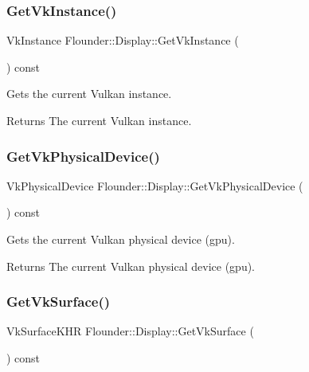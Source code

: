 \subsubsection{\texorpdfstring{Get\+Vk\+Instance()}{GetVkInstance()}}
{\footnotesize\ttfamily Vk\+Instance Flounder\+::\+Display\+::\+Get\+Vk\+Instance (\begin{DoxyParamCaption}{ }\end{DoxyParamCaption}) const\hspace{0.3cm}{\ttfamily [inline]}}



Gets the current Vulkan instance. 

\begin{DoxyReturn}{Returns}
The current Vulkan instance. 
\end{DoxyReturn}
\mbox{\label{class_flounder_1_1_display_a39f7f54ed594d03e338faae3ed104334}} 
\subsubsection{\texorpdfstring{Get\+Vk\+Physical\+Device()}{GetVkPhysicalDevice()}}
{\footnotesize\ttfamily Vk\+Physical\+Device Flounder\+::\+Display\+::\+Get\+Vk\+Physical\+Device (\begin{DoxyParamCaption}{ }\end{DoxyParamCaption}) const\hspace{0.3cm}{\ttfamily [inline]}}



Gets the current Vulkan physical device (gpu). 

\begin{DoxyReturn}{Returns}
The current Vulkan physical device (gpu). 
\end{DoxyReturn}
\mbox{\label{class_flounder_1_1_display_a707b1f26d62b5f065cb84c854c10c33b}} 
\subsubsection{\texorpdfstring{Get\+Vk\+Surface()}{GetVkSurface()}}
{\footnotesize\ttfamily Vk\+Surface\+K\+HR Flounder\+::\+Display\+::\+Get\+Vk\+Surface (\begin{DoxyParamCaption}{ }\end{DoxyParamCaption}) const\hspace{0.3cm}{\ttfamily [inline]}}



